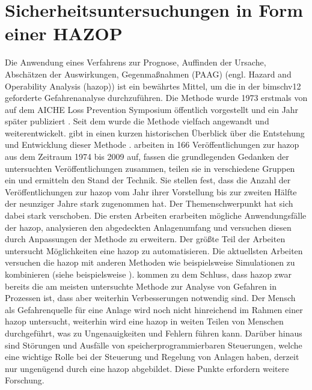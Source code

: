 \section{Sicherheitsuntersuchungen in Form einer HAZOP}\label{sec:sdt_hazop}
Die Anwendung eines Verfahrens zur Prognose, Auffinden der Ursache, Absch\"atzen der Auswirkungen, Gegenma\ss{}nahmen (PAAG) (engl. Hazard and Operability Analysis (\ac{hazop})) ist ein bew\"ahrtes Mittel, um die in der \ac{bimschv12} geforderte Gefahrenanalyse durchzuf\"uhren. Die Methode wurde 1973 erstmals von \citeauthor{Lawley_1974} auf dem AICHE Loss Prevention Symposium \"offentlich vorgestellt und ein Jahr sp\"ater publiziert \cite{Lawley_1974}. Seit dem wurde die Methode vielfach angewandt und weiterentwickelt. \newline
\citeauthor{Kletz_1997} gibt in  einen kurzen historischen \"Uberblick \"uber die Entstehung und Entwicklung dieser Methode \cite{Kletz_1997}. \citeauthor{Dunjo_2010} arbeiten in  \cite{Dunjo_2010} 166 Ver\"offentlichungen zur \ac{hazop} aus dem Zeitraum 1974 bis 2009 auf, fassen die grundlegenden Gedanken der untersuchten Ver\"offentlichungen zusammen, teilen sie in verschiedene Gruppen ein und ermitteln den Stand der Technik. Sie stellen fest, dass die Anzahl der Ver\"offentlichungen zur \ac{hazop} vom Jahr ihrer Vorstellung bis zur zweiten H\"alfte der neunziger Jahre stark zugenommen hat. Der Themenschwerpunkt hat sich dabei stark verschoben. Die ersten Arbeiten erarbeiten m\"ogliche Anwendungsf\"alle der \ac{hazop}, analysieren den abgedeckten Anlagenumfang und versuchen diesen durch Anpassungen der Methode zu erweitern. Der gr\"o\ss{}te Teil der Arbeiten untersucht M\"oglichkeiten eine \ac{hazop} zu automatisieren. Die aktuellsten Arbeiten versuchen die \ac{hazop} mit anderen Methoden wie beispielsweise Simulationen zu kombinieren (siehe beispielsweise \cite{Li_2013}). \citeauthor{Dunjo_2010} kommen zu dem Schluss, dass \ac{hazop} zwar bereits die am meisten untersuchte Methode zur Analyse von Gefahren in Prozessen ist, dass aber weiterhin Verbesserungen notwendig sind. Der Mensch als Gefahrenquelle f\"ur eine Anlage wird noch nicht hinreichend im Rahmen einer \ac{hazop} untersucht, weiterhin wird eine \ac{hazop} in weiten Teilen von Menschen durchgef\"uhrt, was zu Ungenauigkeiten und Fehlern f\"uhren kann. Dar\"uber hinaus sind St\"orungen und Ausf\"alle von speicherprogrammierbaren Steuerungen, welche eine wichtige Rolle bei der Steuerung und Regelung von Anlagen haben, derzeit nur ungen\"ugend durch eine \ac{hazop} abgebildet. Diese Punkte erfordern weitere Forschung.

